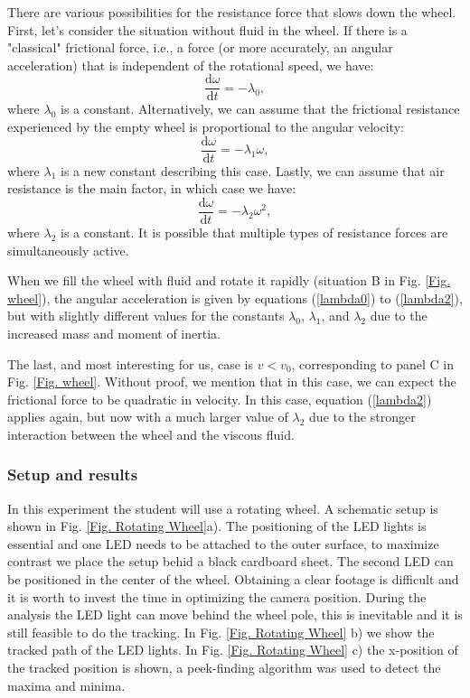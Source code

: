 \documentclass{article}
\begin{document}
There are various possibilities for the resistance force that slows down the wheel. First, let's consider the situation without fluid in the wheel. If there is a "classical" frictional force, i.e., a force (or more accurately, an angular acceleration) that is independent of the rotational speed, we have:
\begin{equation}
    \frac{\mathrm{d} \omega}{\mathrm{d} t} = - \lambda_0, 
    \label{lambda0}
\end{equation}
where $\lambda_0$ is a constant.
Alternatively, we can assume that the frictional resistance experienced by the empty wheel is proportional to the angular velocity:
\begin{equation}
    \frac{\mathrm{d} \omega}{\mathrm{d} t} = - \lambda_1 \omega, \label{lambda1}
\end{equation}
where $\lambda_1$ is a new constant describing this case.
Lastly, we can assume that air resistance is the main factor, in which case we have:
\begin{equation}
    \frac{\mathrm{d} \omega}{\mathrm{d} t} = - \lambda_2 \omega^2, 
    \label{lambda2}
\end{equation}
where $\lambda_2$ is a constant. It is possible that multiple types of resistance forces are simultaneously active.

When we fill the wheel with fluid and rotate it rapidly (situation B in Fig. \ref{Fig. wheel}), the angular acceleration is given by equations (\ref{lambda0}) to (\ref{lambda2}), but with slightly different values for the constants $\lambda_0$, $\lambda_1$, and $\lambda_2$ due to the increased mass and moment of inertia.

The last, and most interesting for us, case is $v < v_0$, corresponding to panel C in Fig. \ref{Fig. wheel}. Without proof, we mention that in this case, we can expect the frictional force to be quadratic in velocity. In this case, equation (\ref{lambda2}) applies again, but now with a much larger value of $\lambda_2$ due to the stronger interaction between the wheel and the viscous fluid.

\subsubsection{Setup and results}
In this experiment the student will use a rotating wheel. A schematic setup is shown in Fig. \ref{Fig. Rotating Wheel}a). The positioning of the LED lights is essential and one LED needs to be attached to the outer surface, to maximize contrast we place the setup behid a black cardboard sheet. The second LED can be positioned in the center of the wheel. Obtaining a clear footage is difficult and it is worth to invest the time in optimizing the camera position. During the analysis the LED light can move behind the wheel pole, this is inevitable and it is still feasible to do the tracking. In Fig. \ref{Fig. Rotating Wheel} b) we show the tracked path of the LED lights. In Fig. \ref{Fig. Rotating Wheel} c) the x-position of the tracked position is shown, a peek-finding algorithm was used to detect the maxima and minima.
\end{document}
